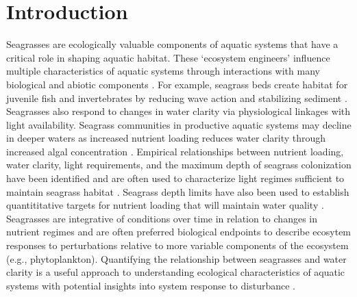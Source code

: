 \documentclass[letterpaper,12pt,oneside]{article}\usepackage[]{graphicx}\usepackage[]{color}
\begin{document}
\clearpage

\acresetall

\section{Introduction}

Seagrasses are ecologically valuable components of aquatic systems that have a critical role in shaping aquatic habitat.  These `ecosystem engineers' influence multiple characteristics of aquatic systems through interactions with many biological and abiotic components \citep{Jones94,Koch01}.  For example, seagrass beds create habitat for juvenile fish and invertebrates by reducing wave action and stabilizing sediment \citep{williams01,Hughes09}.  Seagrasses also respond to changes in water clarity via physiological linkages with light availability.  Seagrass communities in productive aquatic systems may decline in deeper waters as increased nutrient loading reduces water clarity through increased algal concentration \citep{Duarte95}.  Empirical relationships between nutrient loading, water clarity, light requirements, and the maximum depth of seagrass colonization have been identified \citep{Duarte91,Kenworthy96,Choice14} and are often used to characterize light regimes sufficient to maintain seagrass habitat \citep{Steward05}.  Seagrass depth limits have also been used to establish quantititative targets for nutrient loading that will maintain water quality \citep{Janicki96}.  Seagrasses are integrative of conditions over time in relation to changes in nutrient regimes \citep{Duarte95} and are often preferred biological endpoints to describe ecosytem responses to perturbations relative to more variable components of the ecosystem (e.g., phytoplankton).  Quantifying the relationship between seagrasses and water clarity is a useful approach to understanding ecological characteristics of aquatic systems with potential insights into system response to disturbance \citep{Greve05}.    
\end{document}
